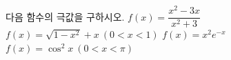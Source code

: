 다음 함수의 극값을 구하시오.
 $f(x)=\dfrac{x^2-3x}{x^2+3}$
 $f(x)=\sqrt{1-x^2}+x\ (0<x<1)$
 $f(x)=x^2e^{-x}$
 $f(x)=\cos^2 x\ (0<x<\pi)$
